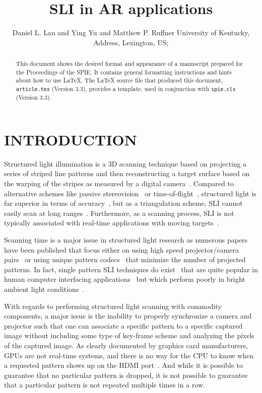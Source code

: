 \documentclass[]{spie}  %
\title{SLI in AR applications}
\author{Daniel L. Lau\supit{a} and Ying Yu\supit{a} and Matthew P. Ruffner\supit{a}
\skiplinehalf
\supit{a}University of Kentucky, Address, Lexington, US; \\
}
\begin{document}
 
  \maketitle 

\begin{abstract}
This document shows the desired format and appearance of a manuscript prepared for the Proceedings of the SPIE.  It contains general formatting instructions and hints about how to use LaTeX.  The LaTeX source file that produced this document, {\tt article.tex} (Version 3.3), provides a template, used in conjunction with {\tt spie.cls} (Version 3.3).  
\end{abstract}



\section{INTRODUCTION}
\label{sec:intro}  %
Structured light illumination is a 3D scanning technique based on projecting a series of striped line patterns and then reconstructing a target surface based on the warping of the stripes as measured by a digital camera~\cite{lieb05}.  Compared to alternative schemes like passive stereovision~\cite{curl96} or time-of-flight~\cite{gokt04}, structured light is far superior in terms of accuracy~\cite{lijl03}, but as a triangulation scheme, SLI cannot easily scan at long ranges~\cite{anyt16}.  Furthermore, as a scanning process, SLI is not typically associated with real-time applications with moving targets~\cite{deet17}.

Scanning time is a major issue in structured light research as numerous papers have been published that focus either on using high speed projector/camera pairs~\cite{gong10} or using unique pattern codecs~\cite{zhan04, suwh06,liuk10} that minimize the number of projected patterns. In fact, single pattern SLI techniques do exist~\cite{take83, wust91, koni06} that are quite popular in human computer interfacing applications~\cite{guan05} but which perform poorly in bright ambient light conditions~\cite{yuan12}. 

With regards to performing structured light scanning with commodity components, a major issue is the inability to properly synchronize a camera and projector such that one can associate a specific pattern to a specific captured image without including some type of key-frame scheme and analyzing the pixels of the captured image. As clearly documented by graphics card manufacturers, GPUs are not real-time systems, and there is no way for the CPU to know when a requested pattern shows up on the HDMI port~\cite{nvid18}. And while it is possible to guarantee that no particular pattern is dropped, it is not possible to guarantee that a particular pattern is not repeated multiple times in a row.
\end{document}
